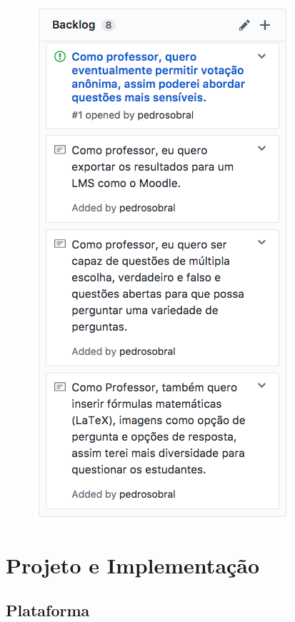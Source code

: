 \begin{figure}[!ht]
{    \includegraphics[scale=0.65,valign=t]{imagens/backlog2.png}
  }
  \doautor
  \label{fig:backlog}
\end{figure}


\section{Projeto e Implementação}

\subsection{Plataforma}

